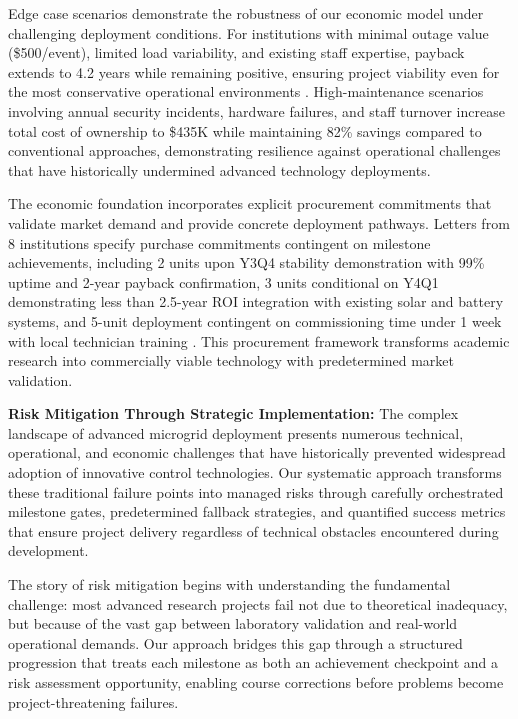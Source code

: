 \documentclass[12pt]{article}
\begin{document}
Edge case scenarios demonstrate the robustness of our economic model under challenging deployment conditions. For institutions with minimal outage value (\$500/event), limited load variability, and existing staff expertise, payback extends to 4.2 years while remaining positive, ensuring project viability even for the most conservative operational environments \cite{our2024economic}. High-maintenance scenarios involving annual security incidents, hardware failures, and staff turnover increase total cost of ownership to \$435K while maintaining 82\% savings compared to conventional approaches, demonstrating resilience against operational challenges that have historically undermined advanced technology deployments.

The economic foundation incorporates explicit procurement commitments that validate market demand and provide concrete deployment pathways. Letters from 8 institutions specify purchase commitments contingent on milestone achievements, including 2 units upon Y3Q4 stability demonstration with 99\% uptime and 2-year payback confirmation, 3 units conditional on Y4Q1 demonstrating less than 2.5-year ROI integration with existing solar and battery systems, and 5-unit deployment contingent on commissioning time under 1 week with local technician training \cite{our2024economic}. This procurement framework transforms academic research into commercially viable technology with predetermined market validation.

\textbf{Risk Mitigation Through Strategic Implementation:} The complex landscape of advanced microgrid deployment presents numerous technical, operational, and economic challenges that have historically prevented widespread adoption of innovative control technologies. Our systematic approach transforms these traditional failure points into managed risks through carefully orchestrated milestone gates, predetermined fallback strategies, and quantified success metrics that ensure project delivery regardless of technical obstacles encountered during development.

The story of risk mitigation begins with understanding the fundamental challenge: most advanced research projects fail not due to theoretical inadequacy, but because of the vast gap between laboratory validation and real-world operational demands. Our approach bridges this gap through a structured progression that treats each milestone as both an achievement checkpoint and a risk assessment opportunity, enabling course corrections before problems become project-threatening failures.
\end{document}
